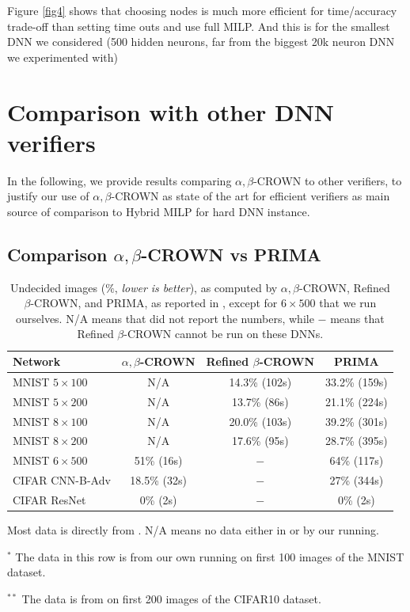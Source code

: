 Figure \ref{fig4} shows that choosing nodes is much more efficient for time/accuracy trade-off than setting time outs and use full MILP. And this is for the smallest DNN we considered (500 hidden neurons, far from the biggest 20k neuron DNN we experimented with)


\section{Comparison with other DNN verifiers}

In the following, we provide results comparing $\alpha,\beta$-CROWN to other verifiers, to justify our use of $\alpha,\beta$-CROWN as state of the art for efficient verifiers as main source of comparison to Hybrid MILP for hard DNN instance.


\subsection*{Comparison $\alpha,\beta$-CROWN vs PRIMA}


\begin{table}[h!]
		\caption{Undecided images ($\%$, {\em lower is better}), as computed by $\alpha,\beta$-CROWN, Refined $\beta$-CROWN, and PRIMA, as reported in \cite{crown}, except for $6 \times 500$ that we run ourselves. N/A means that \cite{crown} did not report the numbers, while $-$ means that Refined $\beta$-CROWN cannot be run on these DNNs.}
	\centering
	\begin{tabular}{||l||c|c||c||}
		\hline \hline
		Network & $\alpha,\beta$-CROWN & Refined $\beta$-CROWN & PRIMA \\ 		  
		\hline
		MNIST $5 \times 100$ & N/A  & 14.3\% (102s) & 33.2\% (159s)\\ \hline
		MNIST $5 \times 200$ & N/A & 13.7\% (86s) & 21.1\% (224s) \\ \hline
		MNIST $8 \times 100$ & N/A  & 20.0\% (103s) & 39.2\% (301s)   \\ \hline
		MNIST $8 \times 200$ & N/A & 17.6\% (95s) & 28.7\% (395s)  \\ \hline
		MNIST $6 \times 500$ & 51\% (16s) & $-$ & 64\% (117s) \\ \hline
		CIFAR CNN-B-Adv & 18.5\% (32s) & $-$ & 27\% (344s)\\ \hline \hline
		CIFAR ResNet & 0\% (2s) & $-$ & 0\% (2s) \\ \hline \hline
	\end{tabular}
	\label{table9}
	\begin{tablenotes}
		\footnotesize
		\item Most data is directly from \cite{crown}. N/A means no data either in \cite{crown} or by our running.
		\item  $^*$ The data in this row is from our own running on first 100 images of the MNIST dataset.
		\item  $^{**}$ The data is from \cite{crown} on first 200 images of the CIFAR10 dataset.
	\end{tablenotes}
	\end{table}


